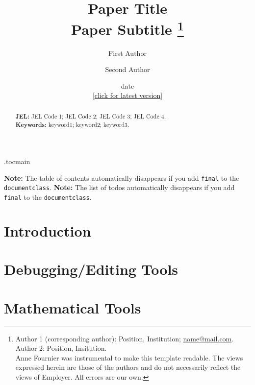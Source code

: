 \documentclass[11 pt]{article}
\title{Paper Title  \\
	Paper Subtitle%
\thanks{%
Author 1 (corresponding author): Position, Institution; \url{name@mail.com}. 
Author 2: Position, Insitution. \\[1ex]
\noindent
Anne Fournier was instrumental to make this template readable. The views expressed herein are those of the authors and do not necessarily reflect the views of Employer. All errors are our own.
}}
\author{%
	\large First Author  \and
	\large Second Author
	}
\date{
	date \\
	\small{[\href{https://github.com/diegojavierjimenez/paper}{click for latest version}]}
}
\begin{document}
\etocdepthtag.toc{main}


\maketitle
\thispagestyle{empty}
\vspace{-4ex}
\begin{abstract}



\vspace{4ex}
\noindent \textbf{JEL: }JEL Code 1; JEL Code 2; JEL Code 3; JEL Code 4. \\
\noindent \textbf{Keywords:} keyword1; keyword2; keyword3.
\end{abstract}
\newpage

\ifoptionfinal
{}%
{
\noindent
\textbf{Note:} The table of contents automatically disappears if you add \texttt{final} to the \texttt{documentclass}.
\tableofcontents
\thispagestyle{empty}
\newpage
\noindent
\textbf{Note:} The list of todos automatically disappears if you add \texttt{final} to the \texttt{documentclass}.
\listoftodos
\thispagestyle{empty}
\newpage
}




\setcounter{page}{1}


\section{Introduction}


\section{Debugging/Editing Tools}


\section{Mathematical Tools}


\newpage
\singlespacing



\newpage
{}

\end{document}
